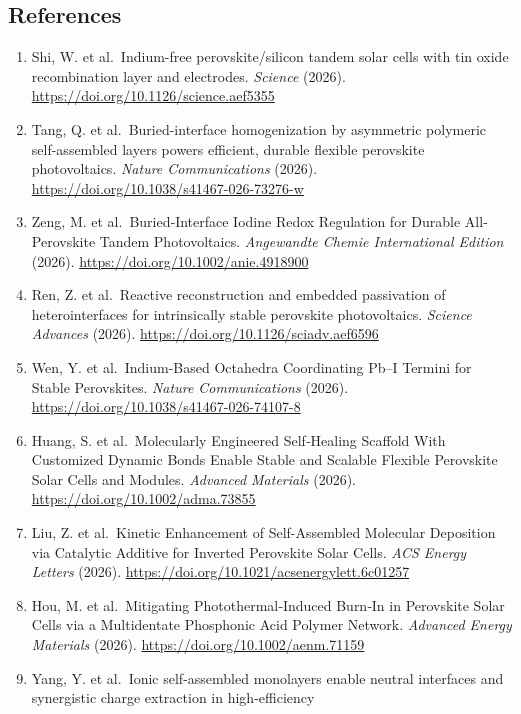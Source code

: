 \documentclass[
  11pt,
]{article}
\providecommand{\tightlist}{%
  \setlength{\itemsep}{0pt}\setlength{\parskip}{0pt}}
\begin{document}
\subsection{References}\label{references}

\begin{enumerate}
\def\labelenumi{\arabic{enumi}.}
\tightlist
\item
  Shi, W. et al.~Indium-free perovskite/silicon tandem solar cells with
  tin oxide recombination layer and electrodes. \emph{Science} (2026).
  \url{https://doi.org/10.1126/science.aef5355}
\item
  Tang, Q. et al.~Buried-interface homogenization by asymmetric
  polymeric self-assembled layers powers efficient, durable flexible
  perovskite photovoltaics. \emph{Nature Communications} (2026).
  \url{https://doi.org/10.1038/s41467-026-73276-w}
\item
  Zeng, M. et al.~Buried‐Interface Iodine Redox Regulation for Durable
  All‐Perovskite Tandem Photovoltaics. \emph{Angewandte Chemie
  International Edition} (2026).
  \url{https://doi.org/10.1002/anie.4918900}
\item
  Ren, Z. et al.~Reactive reconstruction and embedded passivation of
  heterointerfaces for intrinsically stable perovskite photovoltaics.
  \emph{Science Advances} (2026).
  \url{https://doi.org/10.1126/sciadv.aef6596}
\item
  Wen, Y. et al.~Indium-Based Octahedra Coordinating Pb--I Termini for
  Stable Perovskites. \emph{Nature Communications} (2026).
  \url{https://doi.org/10.1038/s41467-026-74107-8}
\item
  Huang, S. et al.~Molecularly Engineered Self‐Healing Scaffold With
  Customized Dynamic Bonds Enable Stable and Scalable Flexible
  Perovskite Solar Cells and Modules. \emph{Advanced Materials} (2026).
  \url{https://doi.org/10.1002/adma.73855}
\item
  Liu, Z. et al.~Kinetic Enhancement of Self-Assembled Molecular
  Deposition via Catalytic Additive for Inverted Perovskite Solar Cells.
  \emph{ACS Energy Letters} (2026).
  \url{https://doi.org/10.1021/acsenergylett.6c01257}
\item
  Hou, M. et al.~Mitigating Photothermal‐Induced Burn‐In in Perovskite
  Solar Cells via a Multidentate Phosphonic Acid Polymer Network.
  \emph{Advanced Energy Materials} (2026).
  \url{https://doi.org/10.1002/aenm.71159}
\item
  Yang, Y. et al.~Ionic self-assembled monolayers enable neutral
  interfaces and synergistic charge extraction in high-efficiency

\end{enumerate}
\end{document}

